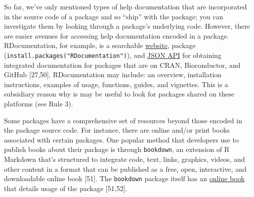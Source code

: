 \documentclass[10pt,letterpaper]{article}
\begin{document}
So far, we've only mentioned types of help documentation that are
incorporated in the source code of a package and so ``ship'' with the
package; you can investigate them by looking through a package's
underlying code. However, there are easier avenues for accessing help
documentation encoded in a package. RDocumentation, for example, is a
searchable \href{https://www.rdocumentation.org/}{website}, package
(\texttt{install.packages("RDocumentation")}), and
\href{https://www.rdocumentation.org/docs/}{JSON API} for obtaining
integrated documentation for packages that are on CRAN, Bioconductor,
and GitHub {[}27,50{]}. RDocumentation may include: an overview,
installation instructions, examples of usage, functions, guides, and
vignettes. This is a subsidiary reason why is may be useful to look for
packages shared on these platforms (see Rule 3).

Some packages have a comprehensive set of resources beyond those encoded
in the package source code. For instance, there are online and/or print
books associated with certain packages. One popular method that
developers use to publish books about their package is through
\texttt{bookdown}, an extension of R Markdown that's structured to
integrate code, text, links, graphics, videos, and other content in a
format that can be published as a free, open, interactive, and
downloadable online book {[}51{]}. The \texttt{bookdown} package itself
has an \href{https://bookdown.org/yihui/bookdown/}{online book} that
details usage of the package {[}51,52{]}.
\end{document}
